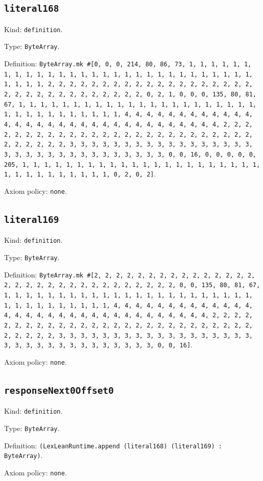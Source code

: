 \documentclass[11pt]{article}
\begin{document}
\subsection*{\texttt{literal168}}
\noindent Kind: \texttt{definition}.\par
\noindent Type: \texttt{ByteArray}.\par
\noindent Definition: \texttt{ByteArray.mk \#[0, 0, 0, 214, 80, 86, 73, 1, 1, 1, 1, 1, 1, 1, 1, 1, 1, 1, 1, 1, 1, 1, 1, 1, 1, 1, 1, 1, 1, 1, 1, 1, 1, 1, 1, 1, 1, 1, 1, 1, 2, 2, 2, 2, 2, 2, 2, 2, 2, 2, 2, 2, 2, 2, 2, 2, 2, 2, 2, 2, 2, 2, 2, 2, 2, 2, 2, 2, 2, 2, 2, 2, 0, 2, 1, 0, 0, 0, 135, 80, 81, 67, 1, 1, 1, 1, 1, 1, 1, 1, 1, 1, 1, 1, 1, 1, 1, 1, 1, 1, 1, 1, 1, 1, 1, 1, 1, 1, 1, 1, 1, 1, 1, 1, 1, 4, 4, 4, 4, 4, 4, 4, 4, 4, 4, 4, 4, 4, 4, 4, 4, 4, 4, 4, 4, 4, 4, 4, 4, 4, 4, 4, 4, 4, 4, 4, 4, 2, 2, 2, 2, 2, 2, 2, 2, 2, 2, 2, 2, 2, 2, 2, 2, 2, 2, 2, 2, 2, 2, 2, 2, 2, 2, 2, 2, 2, 2, 2, 2, 3, 3, 3, 3, 3, 3, 3, 3, 3, 3, 3, 3, 3, 3, 3, 3, 3, 3, 3, 3, 3, 3, 3, 3, 3, 3, 3, 3, 3, 3, 3, 3, 0, 0, 16, 0, 0, 0, 0, 0, 205, 1, 1, 1, 1, 1, 1, 1, 1, 1, 1, 1, 1, 1, 1, 1, 1, 1, 1, 1, 1, 1, 1, 1, 1, 1, 1, 1, 1, 1, 1, 1, 1, 0, 2, 0, 2]}.\par
\noindent Axiom policy: \texttt{none}.\par
\subsection*{\texttt{literal169}}
\noindent Kind: \texttt{definition}.\par
\noindent Type: \texttt{ByteArray}.\par
\noindent Definition: \texttt{ByteArray.mk \#[2, 2, 2, 2, 2, 2, 2, 2, 2, 2, 2, 2, 2, 2, 2, 2, 2, 2, 2, 2, 2, 2, 2, 2, 2, 2, 2, 2, 2, 2, 2, 0, 0, 135, 80, 81, 67, 1, 1, 1, 1, 1, 1, 1, 1, 1, 1, 1, 1, 1, 1, 1, 1, 1, 1, 1, 1, 1, 1, 1, 1, 1, 1, 1, 1, 1, 1, 1, 1, 1, 4, 4, 4, 4, 4, 4, 4, 4, 4, 4, 4, 4, 4, 4, 4, 4, 4, 4, 4, 4, 4, 4, 4, 4, 4, 4, 4, 4, 4, 4, 4, 4, 2, 2, 2, 2, 2, 2, 2, 2, 2, 2, 2, 2, 2, 2, 2, 2, 2, 2, 2, 2, 2, 2, 2, 2, 2, 2, 2, 2, 2, 2, 2, 2, 3, 3, 3, 3, 3, 3, 3, 3, 3, 3, 3, 3, 3, 3, 3, 3, 3, 3, 3, 3, 3, 3, 3, 3, 3, 3, 3, 3, 3, 3, 3, 3, 0, 0, 16]}.\par
\noindent Axiom policy: \texttt{none}.\par
\subsection*{\texttt{responseNext0Offset0}}
\noindent Kind: \texttt{definition}.\par
\noindent Type: \texttt{ByteArray}.\par
\noindent Definition: \texttt{(LexLeanRuntime.append (literal168) (literal169) : ByteArray)}.\par
\noindent Axiom policy: \texttt{none}.\par
\end{document}
